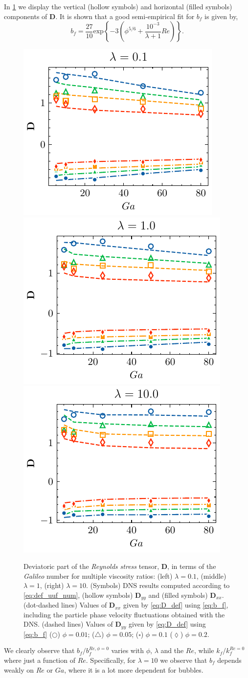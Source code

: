 In \ref{fig:bf} we display the vertical (hollow symbols) and horizontal (filled symbols) components of $\textbf{D}$. 
It is shown that a good semi-empirical fit for $b_f$ is given by, 
\begin{equation}
    b_f = \frac{27}{10}  \text{exp}\left\{- 3\left(\phi^{5/6} + \frac{10^{-3}}{\lambda+1}Re\right)\right\}. 
    \label{eq:b_f}
\end{equation}
\begin{figure}
    \centering
    \includegraphics[height = 0.25\textwidth]{image/HOMOGENEOUS_final/CA/D2_l_0.pdf}
    \includegraphics[height = 0.25\textwidth]{image/HOMOGENEOUS_final/CA/D2_l_1.pdf}
    \includegraphics[height = 0.25\textwidth]{image/HOMOGENEOUS_final/CA/D2_l_10.pdf}
    \caption{Deviatoric part of the \textit{Reynolds stress} tensor, $\textbf{D}$, in terms of the \textit{Galileo} number for multiple viscosity ratios:
    (left) $\lambda = 0.1$,
    (middle) $\lambda = 1$,
    (right) $\lambda = 10$. 
    (Symbols) DNS results computed according to \ref{eq:def_uuf_num}, (hollow symbols) $\textbf{D}_{yy}$ and (filled symbols) $\textbf{D}_{xx}$. 
    (dot-dashed lines) Values of $\textbf{D}_{xx}$ given by \ref{eq:D_def} using \ref{eq:b_f}, including the particle phase velocity fluctuations obtained with the DNS. 
    (dashed lines) Values of $\textbf{D}_{yy}$ given by \ref{eq:D_def} using \ref{eq:b_f}
    ($\pmb\bigcirc$) $\phi = 0.01$; ($\pmb\triangle$) $ \phi = 0.05$; ($\pmb\square$) $\phi = 0.1$ ($\pmb\lozenge$) $\phi = 0.2$.
    }
    \label{fig:bf}
\end{figure}
We clearly observe that $b_f/b_f^{Re,\phi = 0}$ varies with $\phi$, $\lambda$ and the $Re$, while $k_f/k_f^{Re = 0}$ where just a function of $Re$. 
Specifically, for $\lambda = 10$ we observe that $b_f$ depends weakly on $Re$ or $Ga$, where it is a lot more dependent for bubbles. 

